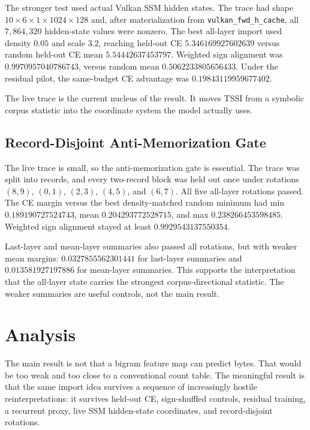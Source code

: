 \documentclass{article}
\begin{document}
The stronger test used actual Vulkan SSM hidden states. The trace had shape
$10 \times 6 \times 1 \times 1024 \times 128$ and, after materialization from
\texttt{vulkan\_fwd\_h\_cache}, all $7,864,320$ hidden-state values were
nonzero. The best all-layer import used density $0.05$ and scale $3.2$,
reaching held-out CE $5.346169927602639$ versus random held-out CE mean
$5.54442637453797$. Weighted sign alignment was $0.9970957040786743$, versus
random mean $0.5062233805656433$. Under the residual pilot, the same-budget CE
advantage was $0.19843119959677402$.

The live trace is the current nucleus of the result. It moves TSSI from a
symbolic corpus statistic into the coordinate system the model actually uses.

\subsection{Record-Disjoint Anti-Memorization Gate}

The live trace is small, so the anti-memorization gate is essential. The trace
was split into records, and every two-record block was held out once under
rotations $(8,9)$, $(0,1)$, $(2,3)$, $(4,5)$, and $(6,7)$. All five all-layer
rotations passed. The CE margin versus the best density-matched random minimum
had min $0.189190727524743$, mean $0.204293772528715$, and max
$0.238266453598485$. Weighted sign alignment stayed at least
$0.9929543137550354$.

Last-layer and mean-layer summaries also passed all rotations, but with weaker
mean margins: $0.0327855562301441$ for last-layer summaries and
$0.013581927197886$ for mean-layer summaries. This supports the interpretation
that the all-layer state carries the strongest corpus-directional statistic.
The weaker summaries are useful controls, not the main result.

\section{Analysis}

The main result is not that a bigram feature map can predict bytes. That would
be too weak and too close to a conventional count table. The meaningful result
is that the same import idea survives a sequence of increasingly hostile
reinterpretations: it survives held-out CE, sign-shuffled controls, residual
training, a recurrent proxy, live SSM hidden-state coordinates, and
record-disjoint rotations.
\end{document}
